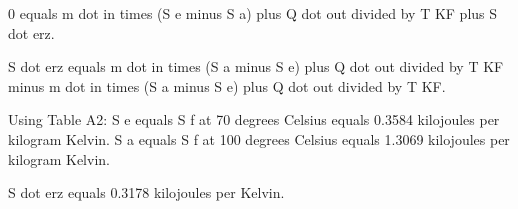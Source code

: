 0 equals m dot in times (S e minus S a) plus Q dot out divided by T KF plus S dot erz.  

S dot erz equals m dot in times (S a minus S e) plus Q dot out divided by T KF minus m dot in times (S a minus S e) plus Q dot out divided by T KF.  

Using Table A2:  
S e equals S f at 70 degrees Celsius equals 0.3584 kilojoules per kilogram Kelvin.  
S a equals S f at 100 degrees Celsius equals 1.3069 kilojoules per kilogram Kelvin.  

S dot erz equals 0.3178 kilojoules per Kelvin.